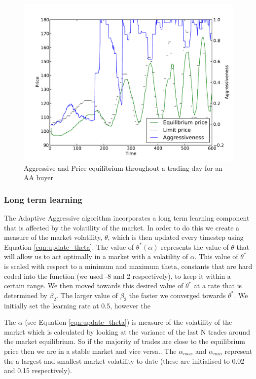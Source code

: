 \documentclass[preprint]{acm_proc_article-sp} %
\begin{document}
\begin{figure} 
\centering
\label{fig:avtime}
\includegraphics[width=\columnwidth]{graphs_and_stats/graph_aggressiveness_vs_price.pdf}
\caption{Aggressive and Price equilibrium throughout a trading day for an AA
buyer}
\end{figure}

\subsubsection{Long term learning} \label{sec:AA_long_term_learning}
The Adaptive Aggressive algorithm incorporates a long term learning component
that is affected by the volatility of the market. In order to do this we create
a measure of the market volatility, $\theta$, which is then updated every
timestep using Equation \ref{eqn:update_theta}. The value of $\theta^*(\alpha)$
represents the value of $\theta$ that will allow us to act optimally in a
market with a volatility of $\alpha$. This value of $\theta^*$ is scaled with
respect to a minimum and maximum theta, constants that are hard coded into the
function (we used -8 and 2 respectively), to keep it within a certain range.
We then moved towards this desired value of $\theta^*$ at a rate that is
determined by $\beta_2$. The larger value of $\beta_2$ the faster we converged
towards $\theta^*$. We initially set the learning rate at 0.5, however the 

The $\alpha$ (see Equation
\ref{eqn:update_theta}) is measure of the volatility of the market which is calculated
by looking at the variance of the last N trades around the market equilibrium.
So if the majority of trades are close to the equilibrium price then we are in
a stable market and vice versa.. The $\alpha_{max}$ and $\alpha_{min}$
represent the a largest and smallest market volatility to date (these are
initialised to 0.02 and 0.15 respectively).
\end{document}
